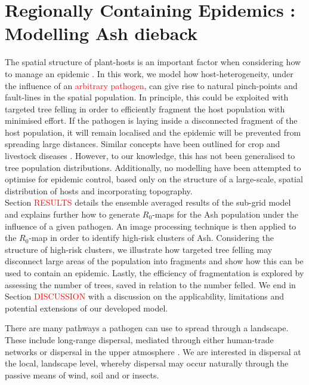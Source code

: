 \chapter{Regionally Containing Epidemics : Modelling Ash dieback}


The spatial structure of plant-hosts is an important factor when considering how to manage %
an epidemic \cite{spatial-control-optimisation, control-heterogeneous-landscapes}. %
In this work, we model how host-heterogeneity, under the influence of an %
\textcolor{red}{arbitrary pathogen}, can give rise to natural pinch-points and fault-lines %
in the spatial population. %
In principle, this could be exploited with targeted tree felling in order to efficiently %
fragment the host population with minimised effort. %
If the pathogen is laying inside a disconnected fragment of the host population, %
it will remain localised and the epidemic will be prevented from spreading large distances. %
Similar concepts have been outlined for crop and livestock diseases \cite{PAPAIX201435, GILIOLI20131, Gilligan-disease-management}. %
However, to our knowledge, this has not been generalised to tree population distributions. %
Additionally, no modelling have been attempted to optimise for epidemic control, based only %
on the structure of a large-scale, spatial distribution of hosts and incorporating topography.\\

Section \textcolor{red}{RESULTS} details the ensemble averaged results of the sub-grid model %
and explains further how to generate $R_0$-maps for the Ash population under the influence of %
a given pathogen. %
An image processing technique is then applied to the $R_0$-map in order to identify high-risk %
clusters of Ash. Considering the structure of high-risk clusters, we illustrate how targeted %
tree felling may disconnect large areas of the population into fragments and show how this %
can be used to contain an epidemic. Lastly, the efficiency of fragmentation is explored by %
assessing the number of trees, saved in relation to the number felled. We end in Section %
\textcolor{red}{DISCUSSION} with a discussion on the applicability, limitations and potential %
extensions of our developed model. %

There are many pathways a pathogen can use to spread through a landscape. %
These include long-range dispersal, mediated through either human-trade networks %
\cite{hulme2009trade, banks2015role, chapman2017global} or dispersal in the upper atmosphere %
\cite{westbrook1999atmospheric, isard2005principles}. %
We are interested in dispersal at the local, landscape level, whereby dispersal may occur %
naturally through the passive means of wind, soil and or insects. %


